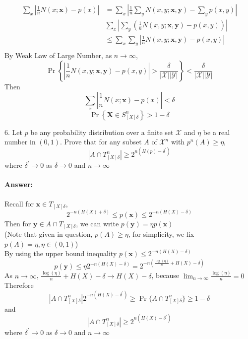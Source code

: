 \documentclass[8pt]{article}
\begin{document}
$$
\begin{aligned}
\sum_{x}\left|\frac{1}{n} N(x ; \mathbf{x})-p(x)\right|
&=\sum_{x}\left|\frac{1}{n} \sum_{y} N(x, y ; \mathbf{x}, \mathbf{y})-\sum_{y} p(x, y)\right| \\
&\sum_{x}\left|\sum_{y}\left(\frac{1}{n} N(x, y ; \mathbf{x}, \mathbf{y})-p(x, y)\right)\right| \\
&\leq \sum_{x} \sum_{y} \left|\frac{1}{n} N(x, y ; \mathbf{x}, \mathbf{y})-p(x, y)\right| \\
\end{aligned}
$$
By Weak Law of Large Number, as $n \rightarrow \infty$,
$$
\operatorname{Pr}\left\{  \left|\frac{1}{n} N(x, y ; \mathbf{x}, \mathbf{y})-p(x, y)\right| >\frac{\delta}{|\mathcal{X}| |\mathcal{Y}|}\right\}<\frac{\delta}{|\mathcal{X}| |\mathcal{Y}|}
$$
Then 
$$
\sum_{x}\left|\frac{1}{n} N(x ; \mathbf{x})-p(x)\right| < \delta
$$
$$
\operatorname{Pr}\left\{\mathbf{X} \in S_{[X] \delta}^{n}\right\}>1-\delta
$$
\begin{tcolorbox}
6. Let $p$ be any probability distribution over a finite set $\mathcal{X}$ and $\eta$ be a real number in $(0,1) .$ Prove that for any subset $A$ of $\mathcal{X}^{n}$ with $p^{n}(A) \geq \eta$,
$$
\left|A \cap T_{[X] \delta}^{n}\right| \geq 2^{n\left(H(p)-\delta^{\prime}\right)}
$$
where $\delta^{\prime} \rightarrow 0$ as $\delta \rightarrow 0$ and $n \rightarrow \infty$
\end{tcolorbox}

\paragraph{Answer:}
Recall for $\mathbf{x} \in T_{[X] \delta}$,
$$
2^{-n(H(X)+\delta)} \leq p(\mathbf{x}) \leq 2^{-n(H(X)-\delta)}
$$
Then for $\mathbf{y} \in A \cap T_{[X] \delta}$, we can write $p(\mathbf{y}) = \eta p(\mathbf{x})$ \\ (Note that given in question, $p(A) \geq \eta$, for simplicity, we fix $p(A) = \eta, \eta \in (0, 1)$)\\
By using the upper bound inequality $p(\mathbf{x}) \leq 2^{-n(H(X)-\delta)}$
$$
p(\mathbf{y}) \leq \eta 2^{-n(H(X)-\delta)} = 2^{-n( \frac{\log(\eta)}{n} + H(X)-\delta)}
$$
As $n \rightarrow \infty$, $\frac{\log(\eta)}{n} +  H(X)-\delta \rightarrow H(X)-\delta$, because $\lim_{n\rightarrow \infty}\frac{\log(\eta)}{n} = 0$
Therefore
$$
\left|A \cap T_{[X] \delta}^{n}\right| 2^{-n(H(X)-\delta^{\prime})} \geq \operatorname{Pr} \{A \cap T_{[X] \delta}^{n} \} \geq 1 - \delta
$$
and
$$
\left|A \cap T_{[X] \delta}^{n}\right| \geq 2^{n(H(X)-\delta^{\prime})}
$$
where $\delta^{\prime} \rightarrow 0$ as $\delta \rightarrow 0$ and $n \rightarrow \infty$
\end{document}
